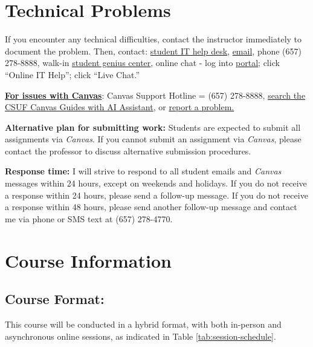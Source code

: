 \documentclass[12pt]{article}     %
\begin{document}
\section{Technical Problems}
If you encounter any technical difficulties, contact the instructor immediately to document the problem. Then, contact: \href{http://www.fullerton.edu/it/students/helpdesk/index.php}{student IT help desk}, \href{mailto:StudentITHelpDesk@fullerton.edu}{email}, phone (657) 278-8888, walk-in \href{http://www.fullerton.edu/it/students/sgc/index.php}{student genius center}, online chat - log into \href{http://my.fullerton.edu}{portal}; click ``Online IT Help''; click ``Live Chat.''

\vspace{0.5em}
\noindent \textbf{\underline{For issues with Canvas}}: Canvas Support Hotline = (657) 278-8888, \href{https://canvashelp.fullerton.edu/}{search the CSUF Canvas Guides with AI Assistant}, or \href{https://titans.service-now.com/sp?id=sc_cat_item&sys_id=f88efe80ebea6a10fb7cfcffcad0cdc6&subject=Canvas}{report a problem.}

\vspace{0.5em}
\noindent \textbf{Alternative plan for submitting work:} Students are expected to submit all assignments via \emph{Canvas}. If you cannot submit an assignment via \emph{Canvas}, please contact the professor to discuss alternative submission procedures.

\vspace{0.5em}
\noindent \textbf{Response time:} I will strive to respond to all student emails and \emph{Canvas} messages within 24 hours, except on weekends and holidays. If you do not receive a response within 24 hours, please send a follow-up message. If you do not receive a response within 48 hours, please send another follow-up message and contact me via phone or SMS text at (657) 278-4770.

\section{Course Information}

\subsection*{Course Format:}
This course will be conducted in a hybrid format, with both in-person and asynchronous online sessions, as indicated in Table \ref{tab:session-schedule}.
\end{document}

